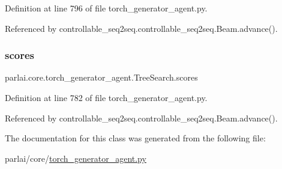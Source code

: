 Definition at line 796 of file torch\+\_\+generator\+\_\+agent.\+py.



Referenced by controllable\+\_\+seq2seq.\+controllable\+\_\+seq2seq.\+Beam.\+advance().

\mbox{\label{classparlai_1_1core_1_1torch__generator__agent_1_1TreeSearch_a07cf31c1808301e5b4d1d0ef128c5948}} 
\subsubsection{\texorpdfstring{scores}{scores}}
{\footnotesize\ttfamily parlai.\+core.\+torch\+\_\+generator\+\_\+agent.\+Tree\+Search.\+scores}



Definition at line 782 of file torch\+\_\+generator\+\_\+agent.\+py.



Referenced by controllable\+\_\+seq2seq.\+controllable\+\_\+seq2seq.\+Beam.\+advance().



The documentation for this class was generated from the following file\+:\begin{DoxyCompactItemize}
\item 
parlai/core/\hyperlink{torch__generator__agent_8py}{torch\+\_\+generator\+\_\+agent.\+py}\end{DoxyCompactItemize}
